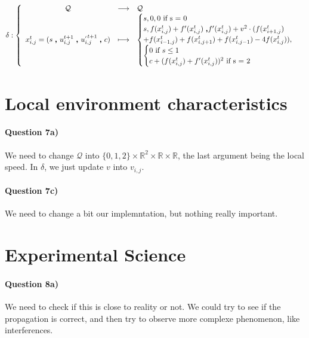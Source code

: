 \documentclass[a4paper,12pt]{article}
\begin{document}
\begin{eqnarray*}
\delta : \left \{ \begin{array}{c c l }
  \mathcal{Q} & \longrightarrow & \mathcal{Q} \\
  x_{i,j}^t = (s \ \pmb{,} \ u^{t+1}_{i,j}\ \pmb{,} \ u^{_{'} t+1}_{i,j} \ \pmb{,} \ c) & \longmapsto &
  \begin{cases}s, 0, 0\mbox{ if s = 0}\\
    s, f(x^{t}_{i,j}) + f'(x^t_{i,j})\ \pmb{,} f'(x^t_{i,j}) + v^2 \cdot (f(x^t_{i+1,j}) \\+ f(x^t_{i-1, j}) + f(x^t_{i, j+1}) + f(x^t_{i, j-1}) - 4 f(x^t_{i, j})),\\
    \begin{cases} 0 \mbox{ if }s \leq 1\\
      c + (f(x^{t}_{i,j}) + f'(x^t_{i,j}))^2 \mbox{ if s = 2} \\
    \end{cases}
  \end{cases}
  \end{array} \right .
\end{eqnarray*}


\section{Local environment characteristics}

\paragraph{Question 7a)} We need to change $\mathcal{Q}$ into $\{0,1,2\} \times \mathbb{R}^2 \times \mathbb{R} \times \mathbb{R}$, the last argument being the local speed. In $\delta$, we just update $v$ into $v_{i,j}$.

\paragraph{Question 7c)} We need to change a bit our implemntation, but nothing really important. 

\section{Experimental Science}

\paragraph{Question 8a)} We need to check if this is close to reality or not. We could try to see if the propagation is correct, and then try to observe more complexe phenomenon, like interferences.
\end{document}
